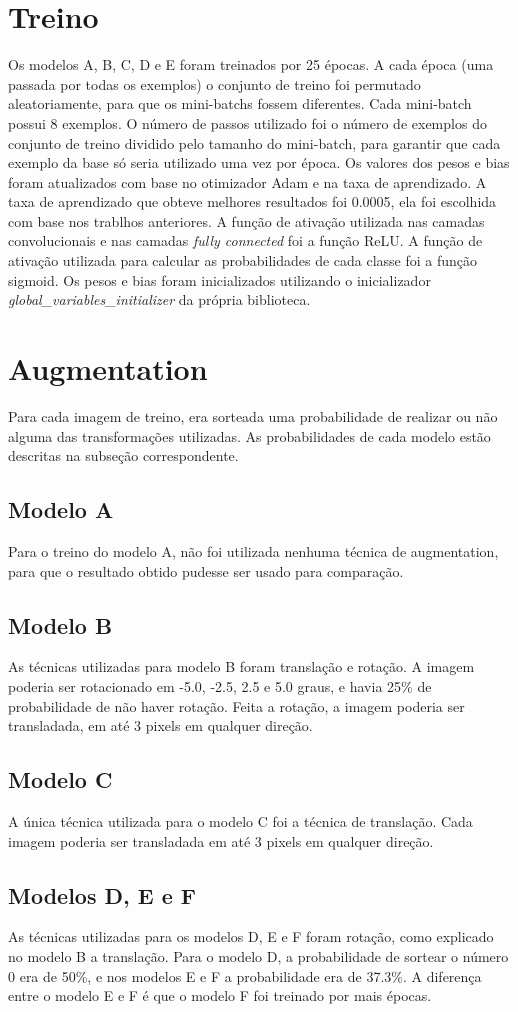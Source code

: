 \documentclass[conference]{IEEEtran}
\begin{document}
\section{Treino}
Os modelos A, B, C, D e E foram treinados por 25 épocas. A cada época (uma passada por todas os exemplos) o conjunto de treino foi permutado aleatoriamente, para que os mini-batchs fossem diferentes. Cada mini-batch possui 8 exemplos. O número de passos utilizado foi o número de exemplos do conjunto de treino dividido pelo tamanho do mini-batch, para garantir que cada exemplo da base só seria utilizado uma vez por época. Os valores dos pesos e bias foram atualizados com base no otimizador Adam e na taxa de aprendizado. A taxa de aprendizado que obteve melhores resultados foi 0.0005, ela foi escolhida com base nos trablhos anteriores. A função de ativação utilizada nas camadas convolucionais e nas camadas \textit{fully connected} foi a função ReLU. A função de ativação utilizada para calcular as probabilidades de cada classe foi a função sigmoid. Os pesos e bias foram inicializados utilizando o inicializador \textit{global\_variables\_initializer} da própria biblioteca.

\section{Augmentation}

Para cada imagem de treino, era sorteada uma probabilidade de realizar ou não alguma das transformações utilizadas. As probabilidades de cada modelo estão descritas na subseção correspondente.

\subsection{Modelo A}
	Para o treino do modelo A, não foi utilizada nenhuma técnica de augmentation, para que o resultado obtido pudesse ser usado para comparação.

\subsection{Modelo B}
	As técnicas utilizadas para modelo B foram translação e rotação. A imagem poderia ser rotacionado em -5.0, -2.5, 2.5 e 5.0 graus, e havia 25\% de probabilidade de não haver rotação. Feita a rotação, a imagem poderia ser transladada, em até 3 pixels em qualquer direção.

\subsection{Modelo C}
	A única técnica utilizada para o modelo C foi a técnica de translação. Cada imagem poderia ser transladada em até 3 pixels em qualquer direção.

\subsection{Modelos D, E e F}
	As técnicas utilizadas para os modelos D, E e F foram rotação, como explicado no modelo B a translação. Para o modelo D, a probabilidade de sortear o número 0 era de 50\%, e nos modelos E e F a probabilidade era de 37.3\%. A diferença entre o modelo E e F é que o modelo F foi treinado por mais épocas.
\end{document}
